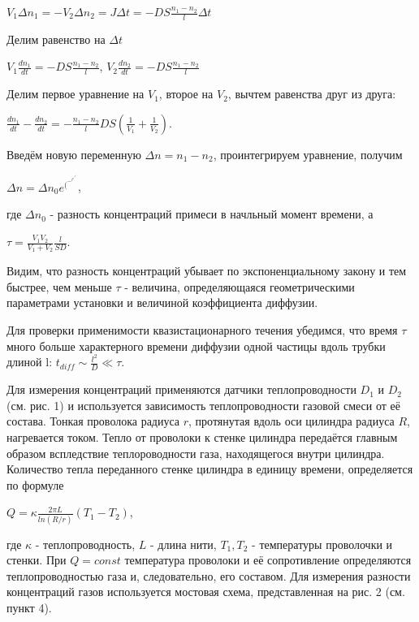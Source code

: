 \documentclass[a4paper, 12pt]{article}
\begin{document}
\begin{center}
\begin{center}
$\displaystyle V_1 \Delta n_1 = - V_2 \Delta n_2 = J \Delta t = -DS \frac{n_1-n_2}{l} \Delta t$
\end{center}
Делим равенство на $\Delta t$
\begin{center}
$\displaystyle V_1 \frac{dn_1}{dt} = -DS\frac{n_1-n_2}{l}$, $V_2 \frac{dn_2}{dt} = -DS\frac{n_1-n_2}{l}$
\end{center}
Делим первое уравнение на $V_1$, второе на $V_2$, вычтем равенства друг из друга:
\begin{center}
$\displaystyle \frac{dn_1}{dt}- \frac{dn_2}{dt} = - \frac{n_1-n_2}{l}DS(\frac{1}{V_1} +\frac{1}{V_2} )$.
\end{center}
Введём новую переменную $\Delta n = n_1-n_2$, проинтегрируем уравнение, получим
\begin{center}
$\Delta n = \Delta n_0 e^(^-^t^/^\tau^)$,
\end{center}
где $\Delta n_0$ - разность концентраций примеси в начльный момент времени, а
\begin{center}
$\displaystyle \tau = \frac{V_1 V_2}{V_1 + V_2} \frac {l}{SD}$.
\end{center}
Видим, что разность концентраций убывает по экспоненциальному закону и тем быстрее, чем меньше $\tau$ - величина, определяющаяся геометрическими параметрами установки и величиной коэффициента диффузии.
\item Для проверки применимости квазистационарного течения убедимся, что время $\tau$ много больше характерного времени диффузии одной частицы вдоль трубки длиной l: $\displaystyle t_{diff} \sim \frac{l^2}{D} \ll \tau$.

\item Для измерения концентраций применяются датчики теплопроводности $D_1$ и $D_2$ (см. рис. 1) и используется зависимость теплопроводности газовой смеси от её состава. Тонкая проволока радиуса $r$, протянутая вдоль оси цилиндра радиуса $R$, нагревается током. Тепло от проволоки к стенке цилиндра передаётся главным образом вспледствие теплороводности газа, находящегося внутри цилиндра. Количество тепла переданного стенке цилиндра в единицу времени, определяется по формуле 
\begin{center}
$\displaystyle Q = \kappa \frac{2\pi L}{ln (R/r)}(T_1-T_2)$,
\end{center}
где $\kappa$ - теплопроводность, $L$ - длина нити, $T_1, T_2$ - температуры проволочки и стенки. При $Q = const$ температура проволоки и её сопротивление определяются теплопроводностью газа и, следовательно, его составом. Для измерения разности концентраций газов используется  
мостовая схема, представленная на рис. 2 (см. пункт 4).


\end{center}
\end{document}
